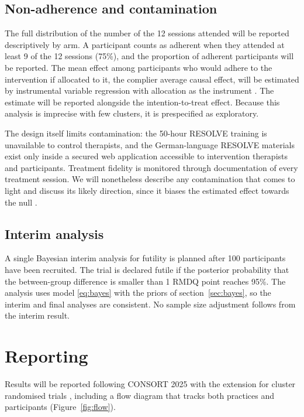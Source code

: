 \documentclass[11pt,a4paper]{article}
\begin{document}
\subsection{Non-adherence and contamination}
\label{sec:adherence}

The full distribution of the number of the 12 sessions attended will be
reported descriptively by arm. A participant counts as adherent when they
attended at least 9 of the 12 sessions (75\%), and the proportion of
adherent participants will be reported.
The mean
effect among participants who would adhere to the intervention if allocated
to it, the complier average causal effect, will be estimated by
instrumental variable regression with allocation as the instrument
\citep{angrist1996}. The estimate will be reported alongside the
intention-to-treat effect. Because this analysis is imprecise with few
clusters, it is prespecified as exploratory.

The design itself limits contamination: the 50-hour
RESOLVE training is unavailable to control therapists, and the German-language
RESOLVE materials exist only inside a secured web application accessible to
intervention therapists and participants. Treatment fidelity is monitored
through documentation of every treatment session. We will nonetheless describe
any contamination that comes to light and discuss its likely direction, since
it biases the estimated effect towards the null \citep{hemming2021}.

\subsection{Interim analysis}
\label{sec:interim}

A single Bayesian interim analysis for futility is planned after
100 participants have been recruited. The trial is
declared futile if the posterior probability that the between-group
difference is smaller than 1 RMDQ point reaches 95\%. The analysis uses
model \eqref{eq:bayes} with the priors of section~\ref{sec:bayes}, so the
interim and final analyses are consistent. No sample size adjustment follows
from the interim result.

\section{Reporting}

Results will be reported following CONSORT 2025 with the extension for cluster
randomised trials \citep{hopewell2025, campbell2012}, including a flow diagram
that tracks both practices and participants (Figure~\ref{fig:flow}).
\end{document}
